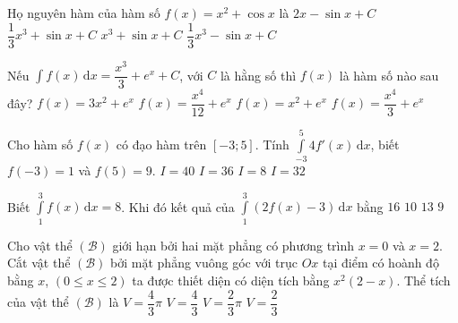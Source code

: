 \begin{ex}%
	Họ nguyên hàm của hàm số $f(x) = x^2+\cos x$ là
	\choice
	{$2x-\sin x+C$}
	{\True $\dfrac{1}{3}x^3+\sin x+C$}
	{$x^3+\sin x+C$}
	{$\dfrac{1}{3}x^3-\sin x+C$}
\end{ex}

\begin{ex}%
	Nếu $\displaystyle\int f(x) \mathrm{\,d}x=\dfrac{x^3}{3}+e^x+C$, với $C$ là hằng số thì $ f(x) $ là hàm số nào sau đây?
	\choice
	{$f(x)=3x^2+e^x$}
	{$f(x)=\dfrac{x^4}{12}+e^x$}
	{\True $f(x)=x^2+e^x$}
	{$f(x)=\dfrac{x^4}{3}+e^x$}
\end{ex}

\begin{ex}%
	Cho hàm số $f(x)$ có đạo hàm trên $[-3;5]$. Tính $\displaystyle\int\limits_ {-3}^5 4f'(x)\mathrm{\,d}x$, biết $f(-3)=1$ và $f(5)=9$.
	\choice
	{$I=40$}
	{ $I=36$}
	{$I=8$}
	{\True  $I=32$}
\end{ex}

\begin{ex}%
	Biết $\displaystyle\int\limits_1^3f(x)\mathrm{\,d}x=8$. Khi đó kết quả của $\displaystyle\int\limits_1^3\left( 2f(x)-3\right)\mathrm{\,d}x$ bằng
	\choice
	{$16$}
	{\True $10$}
	{$13$}
	{$9$}
\end{ex}

\begin{ex}%
	Cho vật thể $(\mathscr{B})$ giới hạn bởi hai mặt phẳng có phương trình $x=0$ và $x=2$. Cắt vật thể $(\mathscr{B})$ bởi mặt phẳng vuông góc với trục $Ox$ tại điểm có hoành độ bằng $x$, $(0\leq x\leq 2)$ ta được thiết diện có diện tích bằng $x^2(2-x)$. Thể tích của vật thể $(\mathscr{B})$ là
	\choice
	{$V=\dfrac{4}{3}\pi$}
	{\True $V=\dfrac{4}{3}$}
	{$V=\dfrac{2}{3}\pi$}
	{$V=\dfrac{2}{3}$}
\end{ex}

